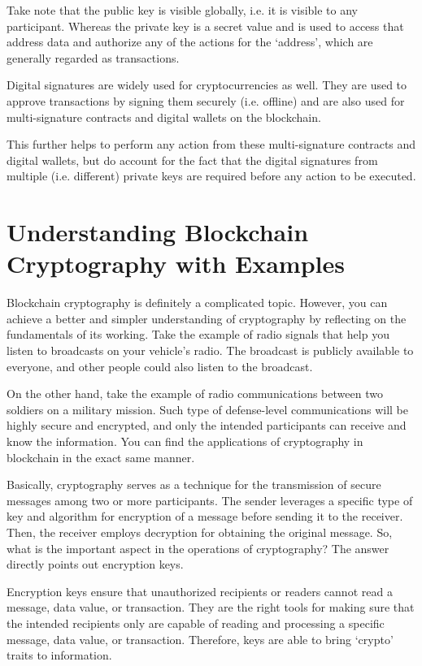 \documentclass[BTech]{srmuthesis}
\begin{document}
 Take note that the public key is visible globally, i.e. it is visible to any participant. Whereas the private key is a secret value and is used to access that address data and authorize any of the actions for the ‘address’, which are generally regarded as transactions.

 Digital signatures are widely used for cryptocurrencies as well. They are used to approve transactions by signing them securely (i.e. offline) and are also used for multi-signature contracts and digital wallets on the blockchain.

 This further helps to perform any action from these multi-signature contracts and digital wallets, but do account for the fact that the digital signatures from multiple (i.e. different) private keys are required before any action to be executed.

 \section{Understanding Blockchain Cryptography with Examples}
 Blockchain cryptography is definitely a complicated topic. However, you can achieve a better and simpler understanding of cryptography by reflecting on the fundamentals of its working. Take the example of radio signals that help you listen to broadcasts on your vehicle’s radio. The broadcast is publicly available to everyone, and other people could also listen to the broadcast.

 On the other hand, take the example of radio communications between two soldiers on a military mission. Such type of defense-level communications will be highly secure and encrypted, and only the intended participants can receive and know the information. You can find the applications of cryptography in blockchain in the exact same manner. 

 Basically, cryptography serves as a technique for the transmission of secure messages among two or more participants. The sender leverages a specific type of key and algorithm for encryption of a message before sending it to the receiver. Then, the receiver employs decryption for obtaining the original message. So, what is the important aspect in the operations of cryptography? The answer directly points out encryption keys. 

 Encryption keys ensure that unauthorized recipients or readers cannot read a message, data value, or transaction. They are the right tools for making sure that the intended recipients only are capable of reading and processing a specific message, data value, or transaction. Therefore, keys are able to bring ‘crypto’ traits to information. 
\end{document}
